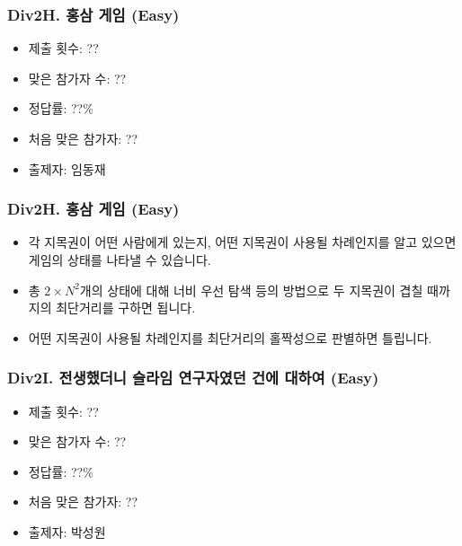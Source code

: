\documentclass[xetex]{beamer}
\begin{document}
\begin{frame}
  \frametitle{Div2H. 홍삼 게임 (Easy)}
  \begin{itemize}
    \item 제출 횟수: ??
    \item 맞은 참가자 수: ??
    \item 정답률: ??\%
    \item 처음 맞은 참가자: ??
    \item 출제자: 임동재
  \end{itemize}
\end{frame}

\begin{frame}
  \frametitle{Div2H. 홍삼 게임 (Easy)}
  \begin{itemize}
    \item 각 지목권이 어떤 사람에게 있는지, 어떤 지목권이 사용될 차례인지를 알고 있으면 게임의 상태를 나타낼 수 있습니다.
    \item 총 $2 \times N^{2}$개의 상태에 대해 너비 우선 탐색 등의 방법으로 두 지목권이 겹칠 때까지의 최단거리를 구하면 됩니다.
    \item 어떤 지목권이 사용될 차례인지를 최단거리의 홀짝성으로 판별하면 틀립니다.
  \end{itemize}
\end{frame}

\begin{frame}
  \frametitle{Div2I. 전생했더니 슬라임 연구자였던 건에 대하여 (Easy)}
  \begin{itemize}
    \item 제출 횟수: ??
    \item 맞은 참가자 수: ??
    \item 정답률: ??\%
    \item 처음 맞은 참가자: ??
    \item 출제자: 박성원
  \end{itemize}
\end{frame}
\end{document}
